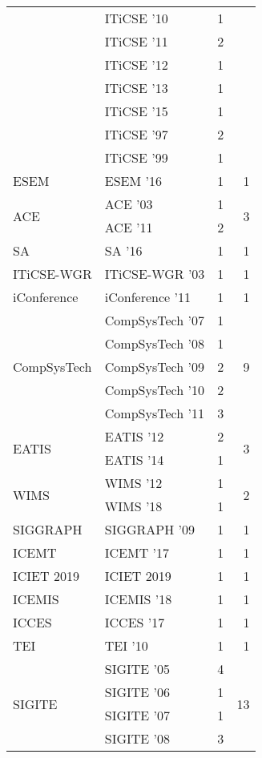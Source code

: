 \begin{table*}[t]
\begin{tabular}{llrr}
& ITiCSE '10 & 1 &\\
& ITiCSE '11 & 2 &\\
& ITiCSE '12 & 1 &\\
& ITiCSE '13 & 1 &\\
& ITiCSE '15 & 1 &\\
& ITiCSE '97 & 2 &\\
& ITiCSE '99 & 1 &\\
\multirow{1}{*}{ESEM } & ESEM '16 & 1 & \multirow{1}{*}{1}\\
\multirow{2}{*}{ACE } & ACE '03 & 1 & \multirow{2}{*}{3}\\
& ACE '11 & 2 &\\
\multirow{1}{*}{SA } & SA '16 & 1 & \multirow{1}{*}{1}\\
\multirow{1}{*}{ITiCSE-WGR } & ITiCSE-WGR '03 & 1 & \multirow{1}{*}{1}\\
\multirow{1}{*}{iConference } & iConference '11 & 1 & \multirow{1}{*}{1}\\
\multirow{5}{*}{CompSysTech } & CompSysTech '07 & 1 & \multirow{5}{*}{9}\\
& CompSysTech '08 & 1 &\\
& CompSysTech '09 & 2 &\\
& CompSysTech '10 & 2 &\\
& CompSysTech '11 & 3 &\\
\multirow{2}{*}{EATIS } & EATIS '12 & 2 & \multirow{2}{*}{3}\\
& EATIS '14 & 1 &\\
\multirow{2}{*}{WIMS } & WIMS '12 & 1 & \multirow{2}{*}{2}\\
& WIMS '18 & 1 &\\
\multirow{1}{*}{SIGGRAPH } & SIGGRAPH '09 & 1 & \multirow{1}{*}{1}\\
\multirow{1}{*}{ICEMT } & ICEMT '17 & 1 & \multirow{1}{*}{1}\\
\multirow{1}{*}{ICIET 2019} & ICIET 2019 & 1 & \multirow{1}{*}{1}\\
\multirow{1}{*}{ICEMIS } & ICEMIS '18 & 1 & \multirow{1}{*}{1}\\
\multirow{1}{*}{ICCES } & ICCES '17 & 1 & \multirow{1}{*}{1}\\
\multirow{1}{*}{TEI } & TEI '10 & 1 & \multirow{1}{*}{1}\\
\multirow{7}{*}{SIGITE } & SIGITE '05 & 4 & \multirow{7}{*}{13}\\
& SIGITE '06 & 1 &\\
& SIGITE '07 & 1 &\\
& SIGITE '08 & 3 &\\

\end{tabular}
\end{table*}
